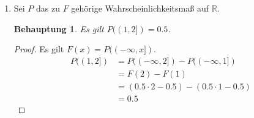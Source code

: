 \documentclass[a4paper]{scrartcl}
\newtheorem*{behaupt}{Behauptung}
\begin{document}
\begin{enumerate}[label=\bfseries\arabic*.]
\begin{enumerate}[label=(\alph*)]
\begin{proof}
                    Es ist leicht zu sehen, dass auch die dritte Bedindung
                    erfüllt ist.
                    \begin{align*}
                        \begin{split}
                            F(-\infty) = \lim_{x \to -\infty} F(x)
                                = \lim_{x \to -\infty} 0
                                = 0
                        \end{split} \\
                        \begin{split}
                            F(-\infty) = \lim_{x \to -\infty} F(x)
                                = \lim_{x \to -\infty} 1
                                = 1
                        \end{split}
                    \end{align*}
                    $F$ ist also eine Verteilungsfunktion.
                \end{proof}

            \item
                Sei $P$ das zu $F$ gehörige Wahrscheinlichkeitsmaß auf
                $\mathbb{R}$.
                \begin{behaupt}
                Es gilt $P((1, 2]) = \num{0,5}$.
                \end{behaupt}
                \begin{proof}
                    Es gilt $F(x) = P((-\infty, x])$.
                    \begin{equation*}
                        \begin{split}
                            P ((1, 2]) &= P((-\infty, 2]) - P((-\infty, 1]) \\
                            &= F(2) - F(1) \\
                            &= (\num{0,5} \cdot 2 - \num{0,5})
                            - (\num{0,5} \cdot 1 - \num{0,5}) \\
                            &= \num{0,5}
                        \end{split}
                    \end{equation*}
                \end{proof}


\end{enumerate}
\end{enumerate}
\end{document}
